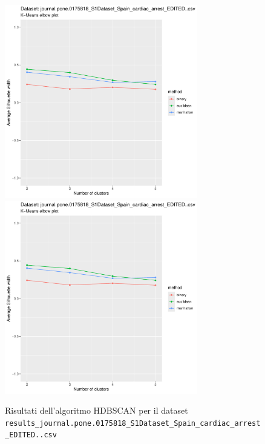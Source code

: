 \documentclass[12pt]{report}
\begin{document}
			\begin{figure}[h]
				\centering
				\includegraphics[width = 0.75\textwidth, height = 0.45\textheight, page = 7]{
					results/results_journal.pone.0175818_S1Dataset_Spain_cardiac_arrest_EDITED..csv.pdf
				}
				\includegraphics[width = 0.75\textwidth, height = 0.45\textheight, page = 8]{
					results/results_journal.pone.0175818_S1Dataset_Spain_cardiac_arrest_EDITED..csv.pdf
				}
				\caption{Risultati dell'algoritmo HDBSCAN per il dataset
				\texttt{results\_journal.pone.0175818\_S1Dataset\_Spain\_cardiac\_arrest\_EDITED..csv}}
				\label{fig:hdbscan2}
			\end{figure}
\end{document}
